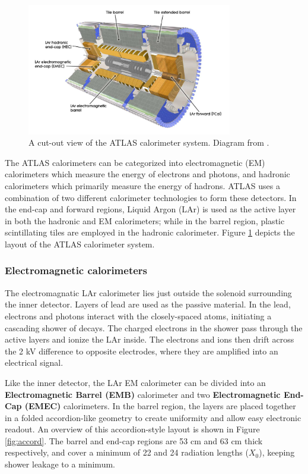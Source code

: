 \begin{figure}[H]
    \centering
    \includegraphics[width=0.8\textwidth]{Figures/2/Calo.png}
    \caption{A cut-out view of the ATLAS calorimeter system. Diagram from \cite{ATLASDesign}.}
    \label{fig:atlascalo}
\end{figure}

The ATLAS calorimeters can be categorized into electromagnetic (EM) calorimeters which measure the energy of electrons and photons, and hadronic calorimeters which primarily measure the energy of hadrons. ATLAS uses a combination of two different calorimeter technologies to form these detectors. In the end-cap and forward regions, Liquid Argon (LAr) is used as the active layer in both the hadronic and EM calorimeters; while in the barrel region, plastic scintillating tiles are employed in the hadronic calorimeter. Figure \ref{fig:atlascalo} depicts the layout of the ATLAS calorimeter system.

\subsubsection{Electromagnetic calorimeters}
The electromagnatic LAr calorimeter lies just outside the solenoid surrounding the inner detector. Layers of lead are used as the passive material. In the lead, electrons and photons interact with the closely-spaced atoms, initiating a cascading shower of decays. The charged electrons in the shower pass through the active layers and ionize the LAr inside. The electrons and ions then drift across the 2 kV difference to opposite electrodes, where they are amplified into an electrical signal.

Like the inner detector, the LAr EM calorimeter can be divided into an \textbf{Electromagnetic Barrel (EMB)} calorimeter and two \textbf{Electromagnetic End-Cap (EMEC)} calorimeters. In the barrel region, the layers are placed together in a folded accordion-like geometry to create uniformity and allow easy electronic readout. An overview of this accordion-style layout is shown in Figure \ref{fig:accord}. The barrel and end-cap regions are 53 cm and 63 cm thick respectively, and cover a minimum of 22 and 24 radiation lengths ($X_0$), keeping shower leakage to a minimum.

